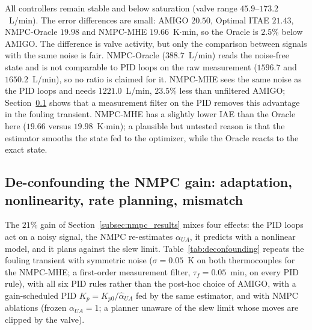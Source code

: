 All controllers remain stable and below saturation (valve range $45.9$--$173.2$~L/min). The error differences are small: AMIGO $20.50$, Optimal ITAE $21.43$, NMPC-Oracle $19.98$ and NMPC-MHE $19.66$~K$\cdot$min, so the Oracle is $2.5\%$ below AMIGO. The difference is valve activity, but only the comparison between signals with the same noise is fair. NMPC-Oracle ($388.7$~L/min) reads the noise-free state and is not comparable to PID loops on the raw measurement ($1596.7$ and $1650.2$~L/min), so no ratio is claimed for it. NMPC-MHE sees the same noise as the PID loops and needs $1221.0$~L/min, $23.5\%$ less than unfiltered AMIGO; Section~\ref{subsec:deconf} shows that a measurement filter on the PID removes this advantage in the fouling transient. NMPC-MHE has a slightly lower IAE than the Oracle here ($19.66$ versus $19.98$~K$\cdot$min); a plausible but untested reason is that the estimator smooths the state fed to the optimizer, while the Oracle reacts to the exact state.

\subsection{De-confounding the NMPC gain: adaptation, nonlinearity, rate planning, mismatch}
\label{subsec:deconf}
The $21\%$ gain of Section~\ref{subsec:nmpc_results} mixes four effects: the PID loops act on a noisy signal, the NMPC re-estimates $\alpha_{UA}$, it predicts with a nonlinear model, and it plans against the slew limit. Table~\ref{tab:deconfounding} repeats the fouling transient with symmetric noise ($\sigma = 0.05$~K on both thermocouples for the NMPC-MHE; a first-order measurement filter, $\tau_f = 0.05$~min, on every PID rule), with all six PID rules rather than the post-hoc choice of AMIGO, with a gain-scheduled PID $K_p = K_{p0}/\hat\alpha_{UA}$ fed by the same estimator, and with NMPC ablations (frozen $\alpha_{UA} = 1$; a planner unaware of the slew limit whose moves are clipped by the valve).



